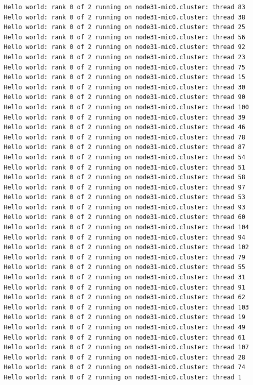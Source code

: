 \documentclass[pscyr,10pt]{hedlab}
\begin{document}
\begin{lstlisting}
  Hello world: rank 0 of 2 running on node31-mic0.cluster: thread 83
  Hello world: rank 0 of 2 running on node31-mic0.cluster: thread 38
  Hello world: rank 0 of 2 running on node31-mic0.cluster: thread 25
  Hello world: rank 0 of 2 running on node31-mic0.cluster: thread 56
  Hello world: rank 0 of 2 running on node31-mic0.cluster: thread 92
  Hello world: rank 0 of 2 running on node31-mic0.cluster: thread 23
  Hello world: rank 0 of 2 running on node31-mic0.cluster: thread 75
  Hello world: rank 0 of 2 running on node31-mic0.cluster: thread 15
  Hello world: rank 0 of 2 running on node31-mic0.cluster: thread 30
  Hello world: rank 0 of 2 running on node31-mic0.cluster: thread 90
  Hello world: rank 0 of 2 running on node31-mic0.cluster: thread 100
  Hello world: rank 0 of 2 running on node31-mic0.cluster: thread 39
  Hello world: rank 0 of 2 running on node31-mic0.cluster: thread 46
  Hello world: rank 0 of 2 running on node31-mic0.cluster: thread 78
  Hello world: rank 0 of 2 running on node31-mic0.cluster: thread 87
  Hello world: rank 0 of 2 running on node31-mic0.cluster: thread 54
  Hello world: rank 0 of 2 running on node31-mic0.cluster: thread 51
  Hello world: rank 0 of 2 running on node31-mic0.cluster: thread 58
  Hello world: rank 0 of 2 running on node31-mic0.cluster: thread 97
  Hello world: rank 0 of 2 running on node31-mic0.cluster: thread 53
  Hello world: rank 0 of 2 running on node31-mic0.cluster: thread 93
  Hello world: rank 0 of 2 running on node31-mic0.cluster: thread 60
  Hello world: rank 0 of 2 running on node31-mic0.cluster: thread 104
  Hello world: rank 0 of 2 running on node31-mic0.cluster: thread 94
  Hello world: rank 0 of 2 running on node31-mic0.cluster: thread 102
  Hello world: rank 0 of 2 running on node31-mic0.cluster: thread 79
  Hello world: rank 0 of 2 running on node31-mic0.cluster: thread 55
  Hello world: rank 0 of 2 running on node31-mic0.cluster: thread 31
  Hello world: rank 0 of 2 running on node31-mic0.cluster: thread 91
  Hello world: rank 0 of 2 running on node31-mic0.cluster: thread 62
  Hello world: rank 0 of 2 running on node31-mic0.cluster: thread 103
  Hello world: rank 0 of 2 running on node31-mic0.cluster: thread 19
  Hello world: rank 0 of 2 running on node31-mic0.cluster: thread 49
  Hello world: rank 0 of 2 running on node31-mic0.cluster: thread 61
  Hello world: rank 0 of 2 running on node31-mic0.cluster: thread 107
  Hello world: rank 0 of 2 running on node31-mic0.cluster: thread 28
  Hello world: rank 0 of 2 running on node31-mic0.cluster: thread 74
  Hello world: rank 0 of 2 running on node31-mic0.cluster: thread 1

\end{lstlisting}
\end{document}
